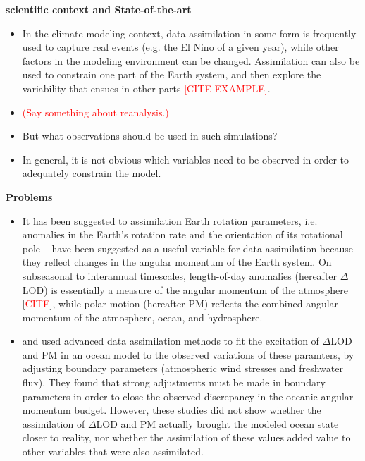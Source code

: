 \documentclass[draft,jgrga]{agutex}
\begin{document}
\begin{article}
 \textbf{scientific context and State-of-the-art }
\begin{itemize}
\item In the climate modeling context, data assimilation in some form is frequently used  to capture real events (e.g. the El Nino of a given year), while other factors in the modeling environment can be changed.  Assimilation can also be used to constrain  one part of the Earth system, and then explore the variability that ensues in other parts \textcolor{red}{[CITE EXAMPLE]}.
\item \textcolor{red}{(Say something about reanalysis.)}
\item But what observations should be used in such simulations?
\item In general, it is not obvious which variables need to be observed in order to adequately constrain the model.
\end{itemize}
%
 \textbf{Problems}
 \begin{itemize}
 \item It has been suggested to assimilation Earth rotation parameters, i.e. anomalies in the Earth's rotation rate and the orientation of its rotational pole -- have been suggested as a useful variable for data assimilation because they reflect changes in the angular momentum of the Earth system.  On subseasonal to interannual timescales, length-of-day anomalies (hereafter $\Delta$LOD) is essentially a measure of the angular momentum of the atmosphere [\textcolor{red}{CITE}], while polar motion (hereafter PM) reflects the combined angular momentum of the atmosphere, ocean, and hydrosphere.
 \item \citet{saynischetal2011a,saynischetal2011b} and \citet{saynischthomas2012} used advanced data assimilation  methods to fit
the excitation of $\Delta$LOD and PM in an ocean model to the observed variations of these paramters, by adjusting boundary parameters (atmospheric wind stresses and
freshwater flux). They found that strong adjustments must be made in boundary
parameters in order to close the observed discrepancy in the oceanic angular
momentum budget.
However, these studies  did not show  whether the assimilation of $\Delta$LOD and PM
actually brought the modeled ocean state closer to reality, nor whether the assimilation of these values added value to other variables that were also assimilated.

\end{itemize}
\end{article}
\end{document}
